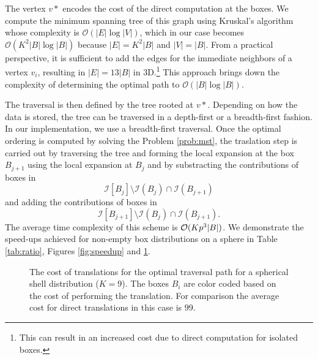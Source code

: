 The vertex $v*$ encodes the cost of the direct computation at the boxes. We compute the minimum spanning tree of this graph using Kruskal's algorithm \cite{kruskal56} whose complexity is $\mathcal{O}(|E| \log |V|)$, which in our case becomes $\mathcal{O}(K^2 |B| \log |B|)$ because $|E| = K^2 |B|$ and $|V| = |B|$. From a practical perspective, it is sufficient to add the edges for the immediate neighbors of a vertex $v_i$, resulting in $|E| = 13 |B|$ in 3D.\footnote{This can result in an increased cost due to direct computation for isolated boxes.} This approach brings down the complexity of determining the optimal path to $\mathcal{O}(|B| \log |B|)$. 

The traversal is then defined by the tree rooted at $v*$. Depending on how the data is stored, the tree can be traversed in a depth-first or a breadth-first fashion. In our implementation, we use a breadth-first traversal. Once the optimal ordering is computed by solving the Problem \ref{prob:mst}, the traslation step is carried out by traversing the tree and forming the local expansion at the box $B_{j+1}$ using the local expansion at $B_j$ and by substracting the contributions of boxes in \[\mathcal{I}[B_j] \setminus \mathcal{I}(B_j)\cap\mathcal{I}(B_{j+1}) \]
and adding the contributions of boxes in 
\[ \mathcal{I}[B_{j+1}] \setminus \mathcal{I}(B_j)\cap\mathcal{I}(B_{j+1}).\] 
The average time complexity of this scheme is $\mathcal{O}(K p^3 |B|)$. 
We demonstrate the speed-ups achieved for non-empty box distributions on a sphere in Table \ref{tab:ratio}, Figures \ref{fig:speedup} and \ref{fig:sphere}.
   

\begin{figure}
\centering 	
{}
\caption{The cost of translations for the optimal traversal path for a spherical shell distribution ($K=9$). The boxes $B_i$ are color coded based on the cost of performing the translation. For comparison the average cost for direct translations in this case is $99$.} \label{fig:sphere}
\end{figure}

